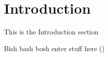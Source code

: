 \section{Introduction}

This is the Introduction section

Bish bash bosh enter stuff here (\cite{Graham1995})

\blindtext